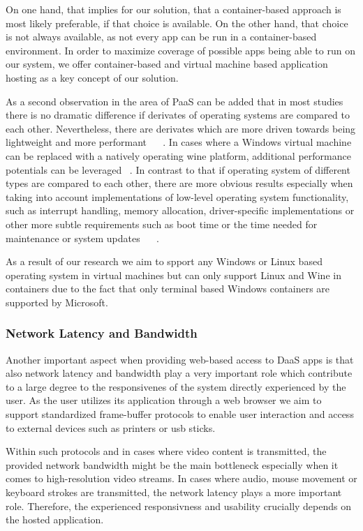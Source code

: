 \documentclass[runningheads]{llncs}
\begin{document}
On one hand, that implies for our solution,
that a container-based approach is most likely preferable,
if that choice is available.
On the other hand, that  choice is not always available,
as not every app can be run in a container-based environment.
In order to maximize coverage of possible apps being able to run on our system,
we offer container-based and virtual machine based application hosting
as a key concept of our solution.

As a second observation in the area of PaaS can be added
that in most studies there is no dramatic difference
if derivates of operating systems are compared to each other.
Nevertheless, there are derivates
which are more driven towards being lightweight and more performant
~\cite{boras2020performance}  %
~\cite{balen2020performance}. %
In cases where a Windows virtual machine can be replaced with a natively operating wine platform,
additional performance potentials can be leveraged
~\cite{huang2012performance}.  %
In contrast to that if operating system of different types are compared to each other,
there are more obvious results
especially when taking into account implementations of low-level operating system functionality,
such as interrupt handling, memory allocation, driver-specific implementations
or other more subtle requirements such as boot time
or the time needed for maintenance or system updates
~\cite{sergeev2022docker} %
~\cite{sulaiman2021comparison}. %

As a result of our research we aim to spport
any Windows or Linux based operating system in virtual machines
but can only support Linux and Wine in containers
due to the fact that only terminal based Windows containers are supported by Microsoft.

\subsubsection{Network Latency and Bandwidth}
Another important aspect when providing web-based access to DaaS apps
is that also network latency and bandwidth play a very important role
which contribute to a large degree to the responsivenes of the system
directly experienced by the user.
As the user utilizes its application through a web browser
we aim to support standardized frame-buffer protocols
to enable user interaction and access to external devices such as printers or usb sticks.

Within such protocols and in cases where video content is transmitted,
the provided network bandwidth might be the main bottleneck
especially when it comes to high-resolution video streams.
In cases where audio, mouse movement or keyboard strokes are transmitted,
the network latency plays a more important role.
Therefore, the experienced responsivness and usability
crucially depends on the hosted application.
\end{document}
